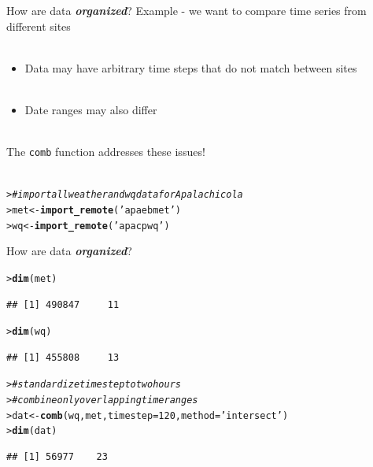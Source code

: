\documentclass[serif]{beamer}\usepackage[]{graphicx}\usepackage[]{color}
\makeatletter
\newcommand{\hlnum}[1]{\textcolor[rgb]{0.686,0.059,0.569}{#1}}%
\newcommand{\hlstr}[1]{\textcolor[rgb]{0.192,0.494,0.8}{#1}}%
\newcommand{\hlcom}[1]{\textcolor[rgb]{0.678,0.584,0.686}{\textit{#1}}}%
\newcommand{\hlstd}[1]{\textcolor[rgb]{0.345,0.345,0.345}{#1}}%
\newcommand{\hlkwb}[1]{\textcolor[rgb]{0.69,0.353,0.396}{#1}}%
\newcommand{\hlkwc}[1]{\textcolor[rgb]{0.333,0.667,0.333}{#1}}%
\newcommand{\hlkwd}[1]{\textcolor[rgb]{0.737,0.353,0.396}{\textbf{#1}}}%
\newenvironment{kframe}{%
 \def\at@end@of@kframe{}%
 \ifinner\ifhmode%
  \def\at@end@of@kframe{\end{minipage}}%
  \begin{minipage}{\columnwidth}%
 \fi\fi%
 \def\FrameCommand##1{\hskip\@totalleftmargin \hskip-\fboxsep
 \colorbox{shadecolor}{##1}\hskip-\fboxsep
     \hskip-\linewidth \hskip-\@totalleftmargin \hskip\columnwidth}%
 \MakeFramed {\advance\hsize-\width
   \@totalleftmargin\z@ \linewidth\hsize
   \@setminipage}}%
 {\par\unskip\endMakeFramed%
 \at@end@of@kframe}
\newenvironment{knitrout}{}{} %
\newcommand{\Bigtxt}[1]{\textbf{\textit{#1}}}
\makeatother
\begin{document}
\begin{frame}[fragile]{How are data \Bigtxt{organized}?}
Example - we want to compare time series from different sites\\~\\
\begin{itemize}
\item Data may have arbitrary time steps that do not match between sites \\~\\
\item Date ranges may also differ \\~\\
\end{itemize}
The \texttt{comb} function addresses these issues! \\~\\
\begin{knitrout}
\color{fgcolor}\begin{kframe}
\begin{alltt}
\hlstd{> }\hlcom{# import all weather and wq data for Apalachicola}
\hlstd{> }\hlstd{met} \hlkwb{<-} \hlkwd{import_remote}\hlstd{(}\hlstr{'apaebmet'}\hlstd{)}
\hlstd{> }\hlstd{wq} \hlkwb{<-} \hlkwd{import_remote}\hlstd{(}\hlstr{'apacpwq'}\hlstd{)}
\end{alltt}
\end{kframe}
\end{knitrout}
\end{frame}

\begin{frame}[fragile]{How are data \Bigtxt{organized}?}
\begin{knitrout}\small
{}\color{fgcolor}\begin{kframe}
\begin{alltt}
\hlstd{> }\hlkwd{dim}\hlstd{(met)}
\end{alltt}
\begin{verbatim}
## [1] 490847     11
\end{verbatim}
\begin{alltt}
\hlstd{> }\hlkwd{dim}\hlstd{(wq)}
\end{alltt}
\begin{verbatim}
## [1] 455808     13
\end{verbatim}
\begin{alltt}
\hlstd{> }\hlcom{# standardize time step to two hours}
\hlstd{> }\hlcom{# combine only overlapping time ranges}
\hlstd{> }\hlstd{dat} \hlkwb{<-} \hlkwd{comb}\hlstd{(wq, met,} \hlkwc{timestep} \hlstd{=} \hlnum{120}\hlstd{,} \hlkwc{method} \hlstd{=} \hlstr{'intersect'}\hlstd{)}
\hlstd{> }\hlkwd{dim}\hlstd{(dat)}
\end{alltt}
\begin{verbatim}
## [1] 56977    23
\end{verbatim}
\end{kframe}
\end{knitrout}
\end{frame}
\end{document}
